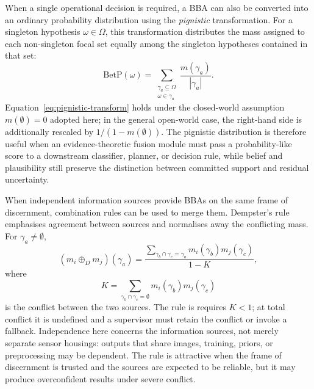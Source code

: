\documentclass[graybox,envcountchap]{style/SNmono}
\providecommand{\DIFadd}[1]{{\protect\color{blue} #1}} %
\providecommand{\DIFdel}[1]{{\protect\color{red} #1}} %
\providecommand{\DIFaddbegin}{} %
\providecommand{\DIFaddend}{} %
\providecommand{\DIFdelbegin}{} %
\providecommand{\DIFdelend}{} %
\begin{document}
When a single operational decision is required, a BBA can also be converted into an ordinary probability distribution using the {\em pignistic} transformation. For a singleton hypothesis \(\omega\in\Omega\), this transformation distributes the mass assigned to each non-singleton focal set equally among the singleton hypotheses contained in that set:
\begin{equation}
\mathrm{BetP}(\omega)=
\sum_{\substack{\gamma_a\subseteq\Omega\\ \omega\in\gamma_a}}
\frac{m(\gamma_a)}{|\gamma_a|}.
\label{eq:pignistic-transform}
\end{equation}
Equation~\eqref{eq:pignistic-transform} holds under the closed-world assumption $m(\emptyset)=0$ adopted here; in the general open-world case, the right-hand side is additionally rescaled by $1/(1-m(\emptyset))$.
The pignistic distribution is therefore useful when an evidence-theoretic fusion module must pass a probability-like score to a downstream classifier, planner, or decision rule, while belief and plausibility still preserve the distinction between committed support and residual uncertainty.

When independent information sources provide BBAs on the same frame of discernment, combination rules can be used to merge them. Dempster's rule emphasises agreement between sources and normalises away the conflicting mass. For \(\gamma_a\neq\emptyset\),
\begin{equation}
(m_i\oplus_D m_j)(\gamma_a)=
\frac{\displaystyle\sum_{\gamma_b \cap \gamma_c=\gamma_a} m_i(\gamma_b)m_j(\gamma_c)}{1-K},
\label{eq:dempster}
\end{equation}
where
\begin{equation}
K=\sum_{\gamma_b \cap \gamma_c=\emptyset}m_i(\gamma_b)m_j(\gamma_c)
\end{equation}
is the conflict between the two sources. The rule \DIFdelbegin \DIFdel{is }\DIFdelend \DIFaddbegin \DIFadd{requires $K<1$; at total conflict it is undefined and a supervisor must retain the conflict or invoke a fallback. Independence here concerns the information sources, not merely separate sensor housings: outputs that share images, training, priors, or preprocessing may be dependent. The rule is }\DIFaddend attractive when the frame of discernment is trusted and the sources are expected to be reliable, but it may produce overconfident results under severe conflict.
\end{document}
